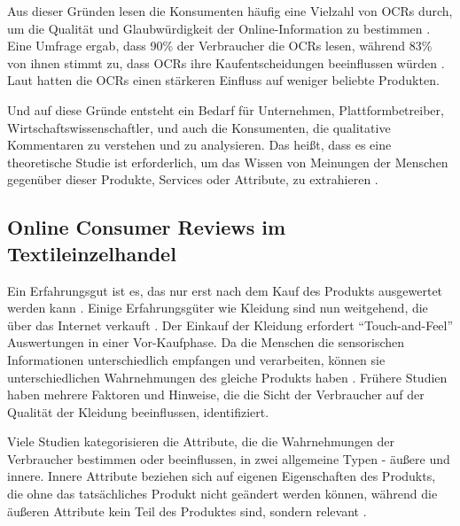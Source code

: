Aus dieser Gründen lesen die Konsumenten häufig eine Vielzahl von \ac{OCRs} durch, um die Qualität und Glaubwürdigkeit der Online-Information zu bestimmen \citep{greer2003evaluating}. Eine Umfrage ergab, dass 90\% der Verbraucher die \ac{OCRs} lesen, während 83\% von ihnen stimmt zu, dass \ac{OCRs} ihre Kaufentscheidungen beeinflussen würden \citep{lu2015understanding}. Laut \citet{Zhu2010} hatten die \ac{OCRs} einen stärkeren Einfluss auf weniger beliebte Produkten.

Und auf diese Gründe entsteht ein Bedarf für Unternehmen, Plattformbetreiber, Wirtschaftswissenschaftler, und auch die Konsumenten, die qualitative Kommentaren zu verstehen und zu analysieren. Das heißt, dass es eine theoretische Studie ist erforderlich, um das Wissen von Meinungen der Menschen gegenüber dieser Produkte, Services oder Attribute, zu extrahieren \citep{Khan2011}. 
\subsection{Online Consumer Reviews im Textileinzelhandel} \label{sec:OCRsinTextil}
Ein Erfahrungsgut ist es, das nur erst nach dem Kauf des Produkts ausgewertet werden kann \citep{nelson1970information}. Einige Erfahrungsgüter wie Kleidung sind nun weitgehend, die über das Internet verkauft \citep{Lee2009a}. Der Einkauf der Kleidung erfordert ``Touch-and-Feel'' Auswertungen in einer Vor-Kaufphase. Da die Menschen die sensorischen Informationen unterschiedlich empfangen und verarbeiten, können sie unterschiedlichen Wahrnehmungen des gleiche Produkts haben \citep[p.~151]{armstrong2014principles}. Frühere Studien haben mehrere Faktoren und Hinweise, die die Sicht der Verbraucher auf der Qualität der Kleidung beeinflussen, identifiziert.

Viele Studien kategorisieren die Attribute, die die Wahrnehmungen der Verbraucher bestimmen oder beeinflussen, in zwei allgemeine Typen - äußere und innere. Innere Attribute beziehen sich auf eigenen Eigenschaften des Produkts, die ohne das tatsächliches Produkt nicht geändert werden können, während die äußeren Attribute kein Teil des Produktes sind, sondern relevant \citep[p.~167]{olson1972proceedings}.

